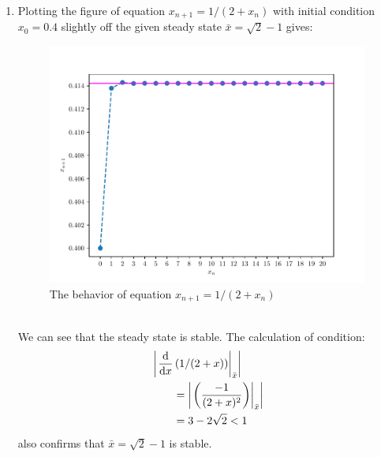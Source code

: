 \begin{homeworkProblem}[2]
\begin{enumerate}
\item Plotting the figure of equation $x_{n+1} = 1/(2+x_n)$ with initial
condition $x_0 = 0.4$ slightly off the given steady state $\bar x = \sqrt{2}
- 1$ gives:
\begin{figure}
    \centering
    \caption{The behavior of equation $x_{n+1} = 1/(2+x_n)$}
    \includegraphics[scale=0.6]{../fig/fig2(c)}
\end{figure}
\\
We can see that the steady state is stable. The calculation of condition:
\[
    \begin{aligned}
        &\left|\left.\frac{\mathrm{d}}{\mathrm{d}x} \left(1/(2+x)\right)\right|_{\bar x}\right|\\
        &\qquad = \left| \left.\left(\frac{-1}{(2+x)^2}\right)\right|_{\bar x}
        \right|\\
        &\qquad = 3 - 2\sqrt{2} < 1
    \end{aligned}
\]
also confirms that $\bar x = \sqrt{2} - 1$ is stable.


\end{enumerate}
\end{homeworkProblem}
